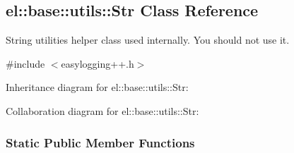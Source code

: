 \hypertarget{a00087}{}\subsection{el\+:\+:base\+:\+:utils\+:\+:Str Class Reference}
\label{a00087}


String utilities helper class used internally. You should not use it.  




{\ttfamily \#include $<$easylogging++.\+h$>$}



Inheritance diagram for el\+:\+:base\+:\+:utils\+:\+:Str\+:


Collaboration diagram for el\+:\+:base\+:\+:utils\+:\+:Str\+:
\subsubsection*{Static Public Member Functions}

